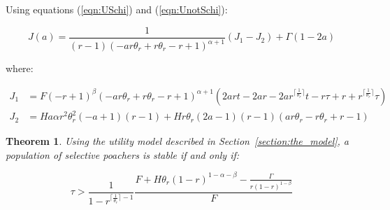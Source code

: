 \documentclass[10pt]{article}
\newtheorem{theorem}{Theorem}
\begin{document}
Using equations (\ref{eqn:USchi}) and (\ref{eqn:UnotSchi}):

\begin{equation}
    J(a) = \frac{1}{\left(r - 1\right) \left(- a r \theta_{r} + r \theta_{r} - r
+ 1\right)^{\alpha + 1}} \left(J_1 - J_2 \right) + \Gamma(1 - 2a)\end{equation}

where:

\begin{align}
    J_1 & = F \left(- r + 1\right)^{\beta} \left(- a r \theta_{r} + r \theta_{r}
    - r + 1\right)^{\alpha + 1} \left(2 a r t - 2 a r - 2 a
r^{\lceil{\frac{1}{\theta_{r}}}\rceil} t - r \tau + r +
r^{\lceil{\frac{1}{\theta_{r}}}\rceil} \tau\right)\\
    J_2 & = H a \alpha r^{2} \theta_{r}^{2} \left(- a + 1\right) \left(r - 1\right) + H r \theta_{r} \left(2 a - 1\right) \left(r - 1\right) \left(a r \theta_{r} - r \theta_{r} + r - 1\right)
\end{align}


\begin{theorem}\label{theorem:selective}
Using the utility model described in Section~\ref{section:the_model},
a population of selective poachers is stable if and only if:

\begin{equation}\label{eq:selective_stability}
    \tau > \frac{1}{1 - r^{\lceil{\frac{1}{\theta_{r}}}\rceil - 1}}
    \frac{F + H \theta_{r} (1 - r) ^{1- \alpha -\beta}-\frac{\Gamma}{r(1-r)^{1-\beta}}}{F}
\end{equation}
\end{theorem}
\end{document}
